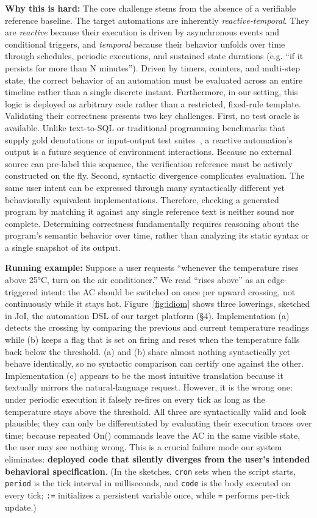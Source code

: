\documentclass[sigconf,nonacm,anonymous,review]{acmart}
\begin{document}
\textbf{Why this is hard:} The core challenge stems from the absence of a verifiable reference baseline. The target automations are inherently \emph{reactive-temporal}. They are \emph{reactive} because their execution is driven by asynchronous events and conditional triggers,
and \emph{temporal} because their behavior unfolds over time through schedules, periodic executions, and sustained state durations (e.g. ``if it persists for more than N minutes'').
Driven by timers, counters, and multi-step state, the correct behavior of an automation must be evaluated across an entire timeline rather than a single discrete instant. Furthermore, in our setting, this logic is deployed as arbitrary code rather than a restricted, fixed-rule template.
Validating their correctness presents two key challenges. First, no test oracle is available. 
Unlike text-to-SQL or traditional programming benchmarks that supply gold denotations or input-output test suites~\cite{spider,humaneval}, a reactive automation's output is a future sequence of environment interactions. Because no external source can pre-label this sequence, the verification reference must be actively constructed on the fly. 
Second, syntactic divergence complicates evaluation. The same user intent can be expressed through many syntactically different yet behaviorally equivalent implementations. Therefore, checking a generated program by matching it against any single reference text is neither sound nor complete. Determining correctness fundamentally requires reasoning about the program’s semantic behavior over time, rather than analyzing its static syntax or a single snapshot of its output.

\textbf{Running example:} Suppose a user requests ``whenever the temperature rises above 25°C, turn on the air conditioner.'' We read ``rises above'' as an edge-triggered intent: the AC should be switched on once per upward crossing, not continuously while it stays hot. Figure~\ref{fig:idiom} shows three lowerings, sketched in JoI, the automation DSL of our target platform (\S4). Implementation (a) detects the crossing by comparing the previous and current temperature readings while (b) keeps a flag that is set on firing and reset when the temperature falls back below the threshold. (a) and (b) share almost nothing syntactically yet behave identically, so no syntactic comparison can certify one against the other. Implementation (c) appears to be the most intuitive translation because it textually mirrors the natural-language request. However, it is the wrong one: under periodic execution it falsely re-fires on every tick as long as the temperature stays above the threshold. All three are syntactically valid and look plausible; they can only be differentiated by evaluating their execution traces over time; because repeated On() commands leave the AC in the same visible state, the user may see nothing wrong. This is a crucial failure mode our system eliminates: \textbf{deployed code that silently diverges from the user's intended behavioral specification}. (In the sketches, \texttt{cron} sets when the script starts, \texttt{period} is the tick interval in milliseconds, and \texttt{code} is the body executed on every tick; \texttt{:=} initializes a persistent variable once, while \texttt{=} performs per-tick update.)
\end{document}
